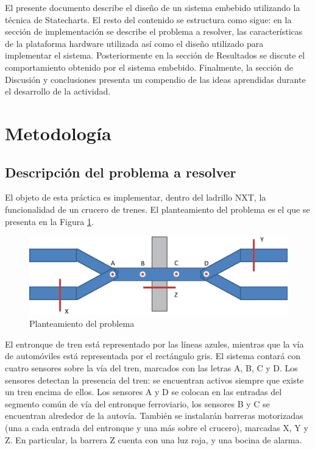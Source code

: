 \documentclass[journal]{IEEEtran}
\begin{document}
El presente documento describe el diseño de un sistema embebido utilizando la técnica de Statecharts.
El resto del contenido se estructura como sigue: en la sección de implementación se describe el problema a resolver, las características de la plataforma hardware utilizada así como el diseño utilizado para implementar el sistema.
Posteriormente en la sección de Resultados se discute el comportamiento obtenido por el sistema embebido.
Finalmente, la sección de Discusión y conclusiones presenta un compendio de las ideas aprendidas durante el desarrollo de la actividad.


\section{Metodología}
\label{sec:metodologia}

\subsection{Descripción del problema a resolver}
\label{sub:descripcion_problema}
El objeto de esta práctica es implementar, dentro del ladrillo NXT, la funcionalidad de un crucero de trenes.
El planteamiento del problema es el que se presenta en la Figura \ref{fig:problema}.

\begin{figure}[!t]
\centering
\includegraphics[width=\columnwidth]{diagramas/problema}
\caption{Planteamiento del problema}
\label{fig:problema}
\end{figure}

El entronque de tren está representado por las líneas azules, mientras que la vía de automóviles está representada por el rectángulo gris.
El sistema contará con cuatro sensores sobre la vía del tren, marcados con las letras A, B, C y D. Los sensores detectan la presencia del tren: se encuentran activos siempre que existe un tren encima de ellos.
Los sensores A y D se colocan en las entradas del segmento común de vía del entronque ferroviario, los sensores B y C se encuentran alrededor de la autovía.
También se instalarán barreras motorizadas (una a cada entrada del entronque y una más sobre el crucero), marcadas X, Y y Z.
En particular, la barrera Z cuenta con una luz roja, y una bocina de alarma.
\end{document}
